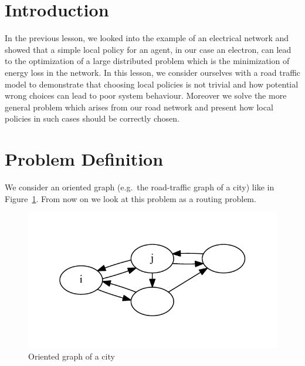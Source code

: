 

\newcommand{\x}{\mathbf{x}}
\newcommand{\y}{\mathbf{y}}
\newcommand{\z}{\mathbf{z}}
\newcommand{\blambda}{\boldsymbol{\lambda}}
\newcommand{\bmu}{\boldsymbol{\nu}}
\usepackage{color}



\section{Introduction}

In the previous lesson, we looked into the example of an electrical network and showed that a simple local policy for an agent, in our case an electron, can lead to the optimization of a large distributed problem which is the minimization of energy loss in the  network. In this lesson, we consider ourselves with a road traffic model to demonstrate that choosing local policies is not trivial and how potential wrong choices can lead to poor system behaviour. Moreover we solve the more general problem which arises from our road network and present how local policies in such cases should be correctly chosen.

\section{Problem Definition}
We consider an oriented graph (e.g.\ the road-traffic graph of a city) like in Figure~\ref{fig:1}. From now on we look at this problem as a routing problem.
\begin{figure}[h!]
\centering
\includegraphics[scale=.7]{fig1.pdf}
\caption{Oriented graph of a city}
\label{fig:1}
\end{figure}

